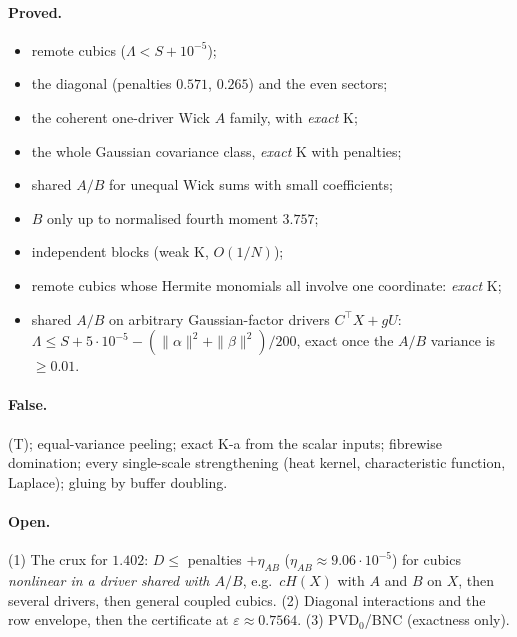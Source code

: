\documentclass[11pt,a4paper]{article}
\begin{document}
\paragraph{Proved.}
\begin{itemize}
\item remote cubics ($\Lambda<S+10^{-5}$);
\item the diagonal (penalties $0.571$, $0.265$) and the even sectors;
\item the coherent one-driver Wick $A$ family, with \emph{exact} K;
\item the whole Gaussian covariance class, \emph{exact} K with penalties;
\item shared $A/B$ for unequal Wick sums with small coefficients;
\item $B$ only up to normalised fourth moment $3.757$;
\item independent blocks (weak K, $O(1/N)$);
\item remote cubics whose Hermite monomials all involve one coordinate: \emph{exact} K;
\item shared $A/B$ on arbitrary Gaussian-factor drivers $C^{\!\top}X+gU$: $\Lambda\le S+5\cdot10^{-5}-(\|\alpha\|^2+\|\beta\|^2)/200$, exact once the $A/B$ variance is $\ge0.01$.
\end{itemize}
\paragraph{False.} (T); equal-variance peeling; exact K-a from the scalar inputs; fibrewise domination; every single-scale strengthening (heat kernel, characteristic function, Laplace);
gluing by buffer doubling.
\paragraph{Open.} (1) The crux for $1.402$: $D\le$ penalties $+\eta_{AB}$ ($\eta_{AB}\approx9.06\cdot10^{-5}$) for cubics \emph{nonlinear in a driver shared with $A/B$}, e.g.\ $cH(X)$ with
$A$ and $B$ on $X$, then several drivers, then general coupled cubics. (2) Diagonal interactions and the row envelope, then the certificate at $\varepsilon\approx0.7564$. (3) PVD$_0$/BNC
(exactness only).
\end{document}
